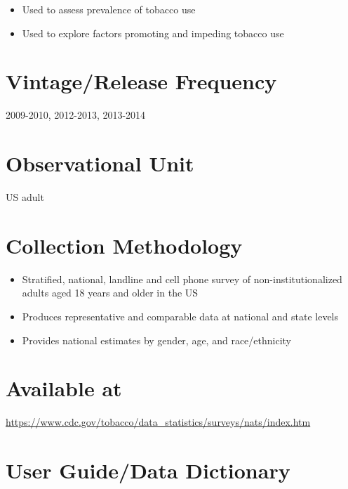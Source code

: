 \documentclass[
]{book}
\providecommand{\tightlist}{%
  \setlength{\itemsep}{0pt}\setlength{\parskip}{0pt}}
\begin{document}
\begin{itemize}
\tightlist
\item
  Used to assess prevalence of tobacco use
\item
  Used to explore factors promoting and impeding tobacco use
\end{itemize}

\hypertarget{vintagerelease-frequency-41}{%
\section{Vintage/Release Frequency}\label{vintagerelease-frequency-41}}

2009-2010, 2012-2013, 2013-2014

\hypertarget{observational-unit-41}{%
\section{Observational Unit}\label{observational-unit-41}}

US adult

\hypertarget{collection-methodology-41}{%
\section{Collection Methodology}\label{collection-methodology-41}}

\begin{itemize}
\tightlist
\item
  Stratified, national, landline and cell phone survey of non-institutionalized adults aged 18 years and older in the US
\item
  Produces representative and comparable data at national and state levels
\item
  Provides national estimates by gender, age, and race/ethnicity
\end{itemize}

\hypertarget{available-at-41}{%
\section{Available at}\label{available-at-41}}

\url{https://www.cdc.gov/tobacco/data_statistics/surveys/nats/index.htm}

\hypertarget{user-guidedata-dictionary-41}{%
\section{User Guide/Data Dictionary}\label{user-guidedata-dictionary-41}}
\end{document}
